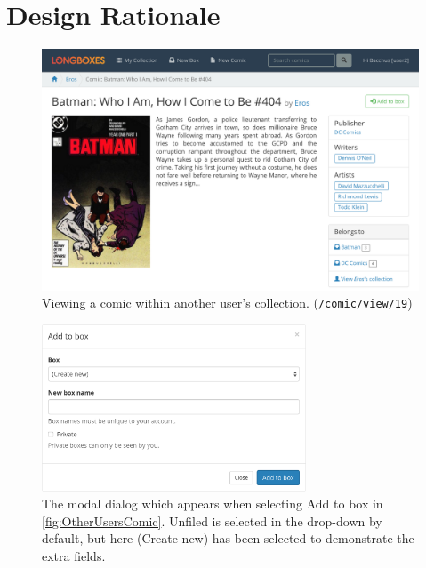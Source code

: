\documentclass[fontsize=12pt,a4paper]{scrreprt}
\begin{document}
\chapter{Design Rationale}


\begin{figure}[h!]
  \centering
  \includegraphics[width=\textwidth]{other_users_comic.png}
  \caption{
    Viewing a comic within another user's collection.
    (\texttt{/comic/view/19})
  }
  \label{fig:OtherUsersComic}
\end{figure}

\begin{figure}[b!]
  \centering
  \includegraphics[width=0.7\textwidth]{add_to_box_modal.png}
  \caption{
    The modal dialog which appears when selecting \textsf{Add to box} in \autoref{fig:OtherUsersComic}.
    \textsf{Unfiled} is selected in the drop-down by default, but here \textsf{(Create new)} has been selected to demonstrate the extra fields.
  }
  \label{fig:AddToBoxModal}
\end{figure}
\end{document}
